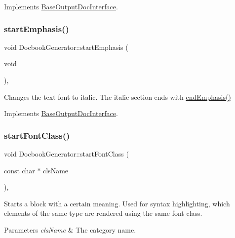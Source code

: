 Implements \mbox{\hyperlink{class_base_output_doc_interface_ac9c801c3ad0b50e3e69be184b50c2fef}{Base\+Output\+Doc\+Interface}}.

\mbox{\label{class_docbook_generator_ad3234d4df4f2e6db5e3e7d1c4c5b8382}} 
\subsubsection{\texorpdfstring{startEmphasis()}{startEmphasis()}}
{\footnotesize\ttfamily void Docbook\+Generator\+::start\+Emphasis (\begin{DoxyParamCaption}\item[{void}]{ }\end{DoxyParamCaption})\hspace{0.3cm}{\ttfamily [inline]}, {\ttfamily [virtual]}}

Changes the text font to italic. The italic section ends with \mbox{\hyperlink{class_docbook_generator_afa388cf9fb6c58601670f40fec5a2eb7}{end\+Emphasis()}} 

Implements \mbox{\hyperlink{class_base_output_doc_interface_a21debc3a6c4c58791a41e715dc78f4ab}{Base\+Output\+Doc\+Interface}}.

\mbox{\label{class_docbook_generator_a899bafb067d2ad8cf7d834e23af83d91}} 
\subsubsection{\texorpdfstring{startFontClass()}{startFontClass()}}
{\footnotesize\ttfamily void Docbook\+Generator\+::start\+Font\+Class (\begin{DoxyParamCaption}\item[{const char $\ast$}]{cls\+Name }\end{DoxyParamCaption})\hspace{0.3cm}{\ttfamily [inline]}, {\ttfamily [virtual]}}

Starts a block with a certain meaning. Used for syntax highlighting, which elements of the same type are rendered using the same \textquotesingle{}font class\textquotesingle{}. 
\begin{DoxyParams}{Parameters}
{\em cls\+Name} & The category name. \\
\hline
\end{DoxyParams}


